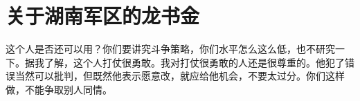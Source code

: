 \section[关于湖南军区的龙书金（一九六七年七月）]{关于湖南军区的龙书金}


这个人是否还可以用？你们要讲究斗争策略，你们水平怎么这么低，也不研究一下。据我了解，这个人打仗很勇敢。我对打仗很勇敢的人还是很尊重的。他犯了错误当然可以批判，但既然他表示愿意改，就应给他机会，不要太过分。你们这样做，不能争取别人同情。


